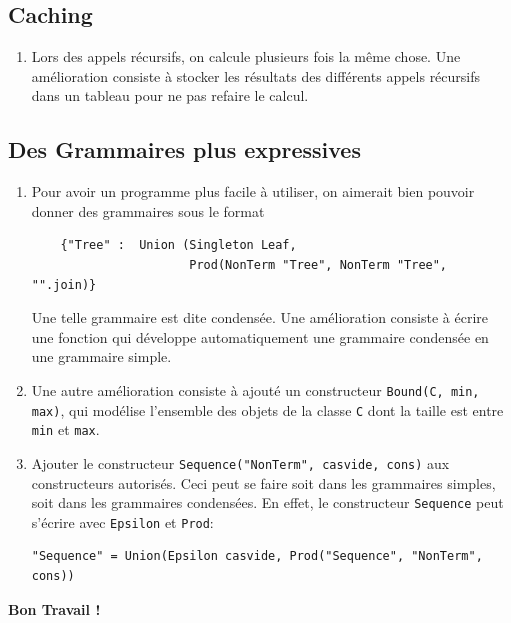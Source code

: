 \documentclass[11pt]{article}
\newcounter{asuivre}
\newenvironment{asks}{\begin{enumerate}\setcounter{enumi}{\theasuivre}}%
                       {\setcounter{asuivre}{\theenumi}\end{enumerate}}
\begin{document}
\subsection{Caching}

\begin{asks}
\item Lors des appels récursifs, on calcule plusieurs fois la même chose. Une
  amélioration consiste à stocker les résultats des différents appels
  récursifs dans un tableau pour ne pas refaire le calcul.
\end{asks}

\subsection{Des Grammaires plus expressives}

\begin{asks}
\item Pour avoir un programme plus facile à utiliser, on aimerait bien pouvoir
  donner des grammaires sous le format
\begin{verbatim}
    {"Tree" :  Union (Singleton Leaf,
                      Prod(NonTerm "Tree", NonTerm "Tree", "".join)}
\end{verbatim}
  Une telle grammaire est dite condensée. Une amélioration consiste à écrire
  une fonction qui développe automatiquement une grammaire
  condensée en une grammaire simple.
\item Une autre amélioration consiste à ajouté un constructeur
  \texttt{Bound(C, min, max)}, qui modélise l'ensemble des objets de la classe
  \texttt{C} dont la taille est entre \texttt{min} et \texttt{max}.
\item Ajouter le constructeur \texttt{Sequence("NonTerm", casvide, cons)} aux
  constructeurs autorisés. Ceci peut se faire soit dans les grammaires
  simples, soit dans les grammaires condensées.  En effet, le constructeur
  \texttt{Sequence} peut s'écrire avec \texttt{Epsilon} et \texttt{Prod}:
\begin{verbatim}
"Sequence" = Union(Epsilon casvide, Prod("Sequence", "NonTerm", cons))
\end{verbatim}
\end{asks}

\bigskip
\bigskip
\bigskip
\hskip10cm{\Large\bf Bon Travail !}
\end{document}
